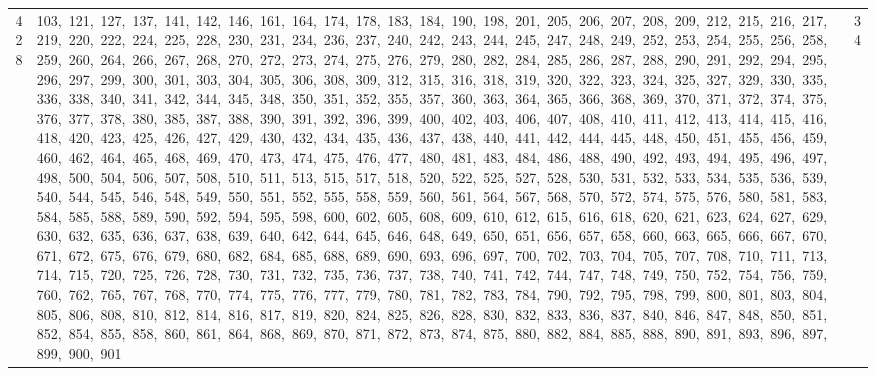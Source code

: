 \begin{longtable}{c|p{}|r}
428 & 103,\ 121,\ 127,\ 137,\ 141,\ 142,\ 146,\ 161,\ 164,\ 174,\ 178,\ 183,\ 184,\ 190,\ 198,\ 201,\ 205,\ 206,\ 207,\ 208,\ 209,\ 212,\ 215,\ 216,\ 217,\ 219,\ 220,\ 222,\ 224,\ 225,\ 228,\ 230,\ 231,\ 234,\ 236,\ 237,\ 240,\ 242,\ 243,\ 244,\ 245,\ 247,\ 248,\ 249,\ 252,\ 253,\ 254,\ 255,\ 256,\ 258,\ 259,\ 260,\ 264,\ 266,\ 267,\ 268,\ 270,\ 272,\ 273,\ 274,\ 275,\ 276,\ 279,\ 280,\ 282,\ 284,\ 285,\ 286,\ 287,\ 288,\ 290,\ 291,\ 292,\ 294,\ 295,\ 296,\ 297,\ 299,\ 300,\ 301,\ 303,\ 304,\ 305,\ 306,\ 308,\ 309,\ 312,\ 315,\ 316,\ 318,\ 319,\ 320,\ 322,\ 323,\ 324,\ 325,\ 327,\ 329,\ 330,\ 335,\ 336,\ 338,\ 340,\ 341,\ 342,\ 344,\ 345,\ 348,\ 350,\ 351,\ 352,\ 355,\ 357,\ 360,\ 363,\ 364,\ 365,\ 366,\ 368,\ 369,\ 370,\ 371,\ 372,\ 374,\ 375,\ 376,\ 377,\ 378,\ 380,\ 385,\ 387,\ 388,\ 390,\ 391,\ 392,\ 396,\ 399,\ 400,\ 402,\ 403,\ 406,\ 407,\ 408,\ 410,\ 411,\ 412,\ 413,\ 414,\ 415,\ 416,\ 418,\ 420,\ 423,\ 425,\ 426,\ 427,\ 429,\ 430,\ 432,\ 434,\ 435,\ 436,\ 437,\ 438,\ 440,\ 441,\ 442,\ 444,\ 445,\ 448,\ 450,\ 451,\ 455,\ 456,\ 459,\ 460,\ 462,\ 464,\ 465,\ 468,\ 469,\ 470,\ 473,\ 474,\ 475,\ 476,\ 477,\ 480,\ 481,\ 483,\ 484,\ 486,\ 488,\ 490,\ 492,\ 493,\ 494,\ 495,\ 496,\ 497,\ 498,\ 500,\ 504,\ 506,\ 507,\ 508,\ 510,\ 511,\ 513,\ 515,\ 517,\ 518,\ 520,\ 522,\ 525,\ 527,\ 528,\ 530,\ 531,\ 532,\ 533,\ 534,\ 535,\ 536,\ 539,\ 540,\ 544,\ 545,\ 546,\ 548,\ 549,\ 550,\ 551,\ 552,\ 555,\ 558,\ 559,\ 560,\ 561,\ 564,\ 567,\ 568,\ 570,\ 572,\ 574,\ 575,\ 576,\ 580,\ 581,\ 583,\ 584,\ 585,\ 588,\ 589,\ 590,\ 592,\ 594,\ 595,\ 598,\ 600,\ 602,\ 605,\ 608,\ 609,\ 610,\ 612,\ 615,\ 616,\ 618,\ 620,\ 621,\ 623,\ 624,\ 627,\ 629,\ 630,\ 632,\ 635,\ 636,\ 637,\ 638,\ 639,\ 640,\ 642,\ 644,\ 645,\ 646,\ 648,\ 649,\ 650,\ 651,\ 656,\ 657,\ 658,\ 660,\ 663,\ 665,\ 666,\ 667,\ 670,\ 671,\ 672,\ 675,\ 676,\ 679,\ 680,\ 682,\ 684,\ 685,\ 688,\ 689,\ 690,\ 693,\ 696,\ 697,\ 700,\ 702,\ 703,\ 704,\ 705,\ 707,\ 708,\ 710,\ 711,\ 713,\ 714,\ 715,\ 720,\ 725,\ 726,\ 728,\ 730,\ 731,\ 732,\ 735,\ 736,\ 737,\ 738,\ 740,\ 741,\ 742,\ 744,\ 747,\ 748,\ 749,\ 750,\ 752,\ 754,\ 756,\ 759,\ 760,\ 762,\ 765,\ 767,\ 768,\ 770,\ 774,\ 775,\ 776,\ 777,\ 779,\ 780,\ 781,\ 782,\ 783,\ 784,\ 790,\ 792,\ 795,\ 798,\ 799,\ 800,\ 801,\ 803,\ 804,\ 805,\ 806,\ 808,\ 810,\ 812,\ 814,\ 816,\ 817,\ 819,\ 820,\ 824,\ 825,\ 826,\ 828,\ 830,\ 832,\ 833,\ 836,\ 837,\ 840,\ 846,\ 847,\ 848,\ 850,\ 851,\ 852,\ 854,\ 855,\ 858,\ 860,\ 861,\ 864,\ 868,\ 869,\ 870,\ 871,\ 872,\ 873,\ 874,\ 875,\ 880,\ 882,\ 884,\ 885,\ 888,\ 890,\ 891,\ 893,\ 896,\ 897,\ 899,\ 900,\ 901 & 34 \\

\end{longtable}
